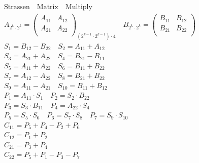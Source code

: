 \documentclass{article}
\begin{document}
\begin{align*}
    \mathrm{Strassen \quad Matrix \quad Multiply} \\
    A_{2^{k} \cdot 2^{k}} = \left(
        \begin{array}{cc}
            A_{11} & A_{12} \\ 
            A_{21} & A_{22} \\
        \end{array} 
    \right)_{(2^{k-1} \cdot 2^{k-1}) \cdot 4} \quad B_{2^{k} \cdot 2^{k}} = \left(
        \begin{array}{cc}
            B_{11} & B_{12} \\ 
            B_{21} & B_{22} \\
        \end{array} 
    \right)\\
    S_1 = B_{12} - B_{22} \quad 
    S_2 = A_{11} + A_{12}\\
    S_3 = A_{21} + A_{22} \quad 
    S_4 = B_{21} - B_{11}\\
    S_5 = A_{11} + A_{22}\quad 
    S_6 = B_{11} + B_{22}\\
    S_7 = A_{12} - A_{22}\quad 
    S_8 = B_{21} + B_{22}\\
    S_9 = A_{11} - A_{21}\quad 
    S_{10} = B_{11} + B_{12} \\
    P_1 = A_{11} \cdot S_{1} \quad 
    P_2 = S_{2} \cdot B_{22} \\
    P_3 = S_{3} \cdot B_{11} \quad 
    P_4 = A_{22} \cdot S_{4} \\
    P_5 = S_{5} \cdot S_{6} \quad 
    P_6 = S_{7} \cdot S_{8} \quad 
    P_7 = S_{9} \cdot S_{10}\\
    C_{11} = P_5 + P_4 - P_2 + P_6\\C_{12} = P_1 + P_2\\C_{21} = P_3 + P_4\\C_{22} = P_5 + P_1 - P_3 - P_7
\end{align*}
\end{document}
